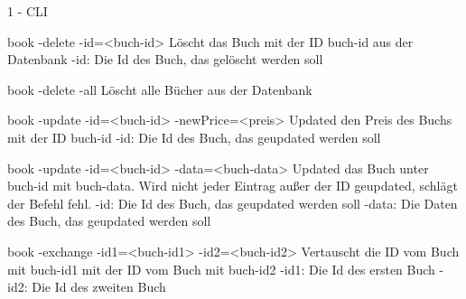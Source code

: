 \documentclass[a4paper]{article}
\begin{document}
\begin{exercise}{1 - CLI}
\begin{itemize}
book -delete -id=<buch-id>
  Löscht das Buch mit der ID buch-id aus der Datenbank
  -id: Die Id des Buch, das gelöscht werden soll

book -delete -all
  Löscht alle Bücher aus der Datenbank

book -update -id=<buch-id> -newPrice=<preis>
  Updated den Preis des Buchs mit der ID buch-id
  -id: Die Id des Buch, das geupdated werden soll

book -update -id=<buch-id> -data=<buch-data>
  Updated das Buch unter buch-id mit buch-data. Wird nicht jeder Eintrag außer der ID geupdated, schlägt der Befehl fehl.
  -id: Die Id des Buch, das geupdated werden soll
  -data: Die Daten des Buch, das geupdated werden soll

book -exchange -id1=<buch-id1> -id2=<buch-id2>
  Vertauscht die ID vom Buch mit buch-id1 mit der ID vom Buch mit buch-id2
  -id1: Die Id des ersten Buch
  -id2: Die Id des zweiten Buch
\end{itemize}
\end{exercise}
\end{document}
